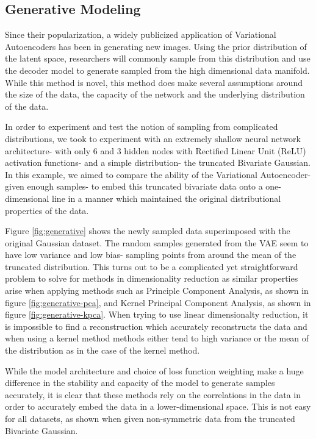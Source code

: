 \documentclass[12pt]{article}
\begin{document}
\newpage
\subsection{Generative Modeling}
Since their popularization, a widely publicized application of Variational Autoencoders has been in generating new images.  Using the prior distribution of the latent space, researchers will commonly sample from this distribution and use the decoder model to generate sampled from the high dimensional data manifold. While this method is novel, this method does make several assumptions around the size of the data, the capacity of the network and the underlying distribution of the data.  
  
In order to experiment and test the notion of sampling from complicated distributions, we took to experiment with an extremely shallow neural network architecture- with only 6 and 3 hidden nodes with Rectified Linear Unit (ReLU) activation functions- and a simple distribution- the truncated Bivariate Gaussian. In this example, we aimed to compare the ability of the Variational Autoencoder- given enough samples- to embed this truncated bivariate data onto a one-dimensional line in a manner which maintained the original distributional properties of the data. 
  
Figure \ref{fig:generative} shows the newly sampled data superimposed with the original Gaussian dataset. The random samples generated from the VAE seem to have low variance and low bias- sampling points from around the mean of the truncated distribution.  This turns out to be a complicated yet straightforward problem to solve for methods in dimensionality reduction as similar properties arise when applying methods such as Principle Component Analysis, as shown in figure \ref{fig:generative-pca}, and Kernel Principal Component Analysis, as shown in figure \ref{fig:generative-kpca}. When trying to use linear dimensionalty reduction, it is impossible to find a reconstruction which accurately reconstructs the data and when using a kernel method methods either tend to high variance or the mean of the distribution as in the case of the kernel method.  
  
While the model architecture and choice of loss function weighting make a huge difference in the stability and capacity of the model to generate samples accurately, it is clear that these methods rely on the correlations in the data in order to accurately embed the data in a lower-dimensional space. This is not easy for all datasets, as shown when given non-symmetric data from the truncated Bivariate Gaussian.  
\end{document}
